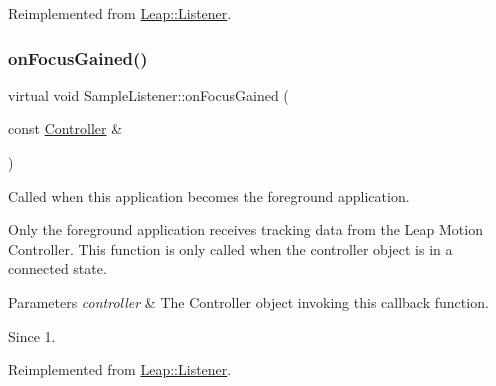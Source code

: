 Reimplemented from \hyperlink{class_leap_1_1_listener_ac8f779a9208101f0084953560923f88c}{Leap\+::\+Listener}.

\mbox{\label{class_sample_listener_afd74ae8efc625ef62985d9d0fa33290c}} 
\subsubsection{\texorpdfstring{on\+Focus\+Gained()}{onFocusGained()}\hspace{0.1cm}{\footnotesize\ttfamily [1/2]}}
{\footnotesize\ttfamily virtual void Sample\+Listener\+::on\+Focus\+Gained (\begin{DoxyParamCaption}\item[{const \hyperlink{class_leap_1_1_controller}{Controller} \&}]{ }\end{DoxyParamCaption})\hspace{0.3cm}{\ttfamily [virtual]}}

Called when this application becomes the foreground application.

Only the foreground application receives tracking data from the Leap Motion Controller. This function is only called when the controller object is in a connected state.


\begin{DoxyCodeInclude}
\end{DoxyCodeInclude}



\begin{DoxyParams}{Parameters}
{\em controller} & The Controller object invoking this callback function. \\
\hline
\end{DoxyParams}
\begin{DoxySince}{Since}
1. 
\end{DoxySince}


Reimplemented from \hyperlink{class_leap_1_1_listener_ab52aa99ad9e8fd0f35d9dffc3ef9f027}{Leap\+::\+Listener}.

\mbox{\label{class_sample_listener_a17d7075b90f556b34682eefd1f966219}} 
